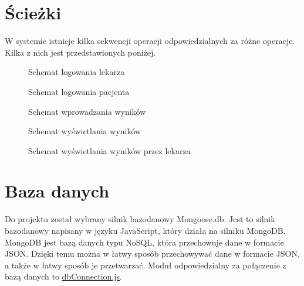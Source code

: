 \documentclass{documentation}
\begin{document}
\section{Ścieżki}

W systemie istnieje kilka sekwencji operacji odpowiedzialnych za różne operacje.
Kilka z nich jest przedstawionych poniżej.

\begin{figure}[h]
    \centering
    \begin{tikzpicture}[node distance=3cm]
        
    \end{tikzpicture}
    \caption{Schemat logowania lekarza\label{fig:loginDoc}}
\end{figure}

\begin{figure}[h]
    \centering
    
    \caption{Schemat logowania pacjenta\label{fig:login}}
\end{figure}

\begin{figure}[h]
    \centering
    
    \caption{Schemat wprowadzania wyników\label{fig:dataInput}}
\end{figure}

\begin{figure}[h]
    \centering
    
    \caption{Schemat wyświetlania wyników\label{fig:dataOutput}}
\end{figure}

\begin{figure}[h]
    \centering
    
    \caption{Schemat wyświetlania wyników przez lekarza\label{fig:dataOutputDoc}}
\end{figure}

\section{Baza danych}

Do projektu został wybrany silnik bazodanowy Mongoose.db.
Jest to silnik bazodanowy napisany w języku JavaScript, który działa na silniku MongoDB.
MongoDB jest bazą danych typu NoSQL, która przechowuje dane w formacie JSON.
Dzięki temu można w łatwy sposób przechowywać dane w formacie JSON, a także w łatwy sposób je przetwarzać.
Moduł odpowiedzialny za połączenie z bazą danych to \href{https://github.com/Stanlee77/ASSASSIN/blob/master/backend/db/dbConnection.js}{dbConnection.js}.
\end{document}
